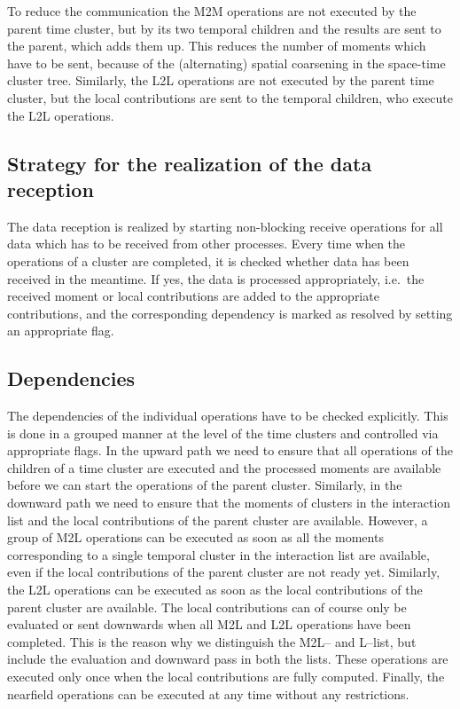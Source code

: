\documentclass[a4paper,11pt]{article}
\theoremstyle{plain}
\theoremstyle{definition}
\theoremstyle{remark}
\begin{document}
To reduce the communication the M2M operations are not executed by the parent time cluster, but by its two temporal children and the results are sent to the parent, which adds them up. This reduces the number of moments which have to be sent, because of the (alternating) spatial coarsening in the space-time cluster tree. Similarly, the L2L operations are not executed by the parent time cluster, but the local contributions are sent to the temporal children, who execute the L2L operations.

\subsection{Strategy for the realization of the data reception}
The data reception is realized by starting non-blocking receive operations for all data which has to be received from other processes. Every time when the operations of a cluster are completed, it is checked whether data has been received in the meantime. If yes, the data is processed appropriately, i.e.~the received moment or local contributions are added to the appropriate contributions, and the corresponding dependency is marked as resolved by setting an appropriate flag.

\subsection{Dependencies}
The dependencies of the individual operations have to be checked explicitly. This is done in a grouped manner at the level of the time clusters and controlled via appropriate flags. In the upward path we need to ensure that all operations of the children of a time cluster are executed and the processed moments are available before we can start the operations of the parent cluster. Similarly, in the downward path we need to ensure that the moments of clusters in the interaction list and the local contributions of the parent cluster are available. However, a group of M2L operations can be executed as soon as all the moments corresponding to a single temporal cluster in the interaction list are available, even if the local contributions of the parent cluster are not ready yet. Similarly, the L2L operations can be executed as soon as the local contributions of the parent cluster are available. The local contributions can of course only be evaluated or sent downwards when all M2L and L2L operations have been completed. This is the reason why we distinguish the M2L-- and L--list, but include the evaluation and downward pass in both the lists. These operations are executed only once when the local contributions are fully computed. Finally, the nearfield operations can be executed at any time without any restrictions.
\end{document}
